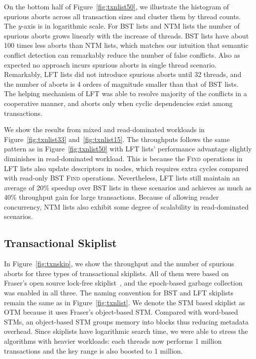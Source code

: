 \documentclass[]{sig-alternate-05-2015}
\begin{document}
On the bottom half of Figure~\ref{fig:txnlist50}, we illustrate the histogram of spurious aborts across all transaction sizes and cluster them by thread counts.
The $y$-axis is in logarithmic scale.
For BST lists and NTM lists the number of spurious aborts grows linearly with the increase of threads.
BST lists have about 100 times less aborts than NTM lists, which matches our intuition that semantic conflict detection can remarkably reduce the number of false conflicts.
Also as expected no approach incurs spurious aborts in single thread scenario.
Remarkably, LFT lists did not introduce spurious aborts until 32 threads, and the number of aborts is 4 orders of magnitude smaller than that of BST lists. 
The helping mechanism of LFT was able to resolve majority of the conflicts in a cooperative manner, and aborts only when cyclic dependencies exist among transactions.

We show the results from mixed and read-dominated workloads in Figure~\ref{fig:txnlist33} and~\ref{fig:txnlist15}. 
The throughputs follows the same pattern as in Figure~\ref{fig:txnlist50} with LFT lists' performance advantage slightly diminishes in read-dominated workload.
This is because the \textsc{Find} operations in LFT lists also update descriptors in nodes, which requires extra cycles compared with read-only BST \textsc{Find} operations.
Nevertheless, LFT lists still maintain an average of 20\% speedup over BST lists in these scenarios and achieves as much as 40\% throughput gain for large transactions.  
Because of allowing reader concurrency, NTM lists also exhibit some degree of scalability in read-dominated scenarios.

\subsection{Transactional Skiplist}
\label{sec:txnskiplistexp}
In Figure~\ref{fig:txnskip}, we show the throughput and the number of spurious aborts for three types of transactional skiplists.
All of them were based on Fraser's open source lock-free skiplist~\cite{fraser2004practical}, and the epoch-based garbage collection was enabled in all three. 
The naming convention for BST and LFT skiplists remain the same as in Figure~\ref{fig:txnlist}.
We denote the STM based skiplist as OTM because it uses Fraser's object-based STM.
Compared with word-based STMs, an object-based STM groups memory into blocks thus reducing metadata overhead.
Since skiplists have logarithmic search time, we were able to stress the algorithms with heavier workloads: each threads now performs 1 million transactions and the key range is also boosted to 1 million.
\end{document}
